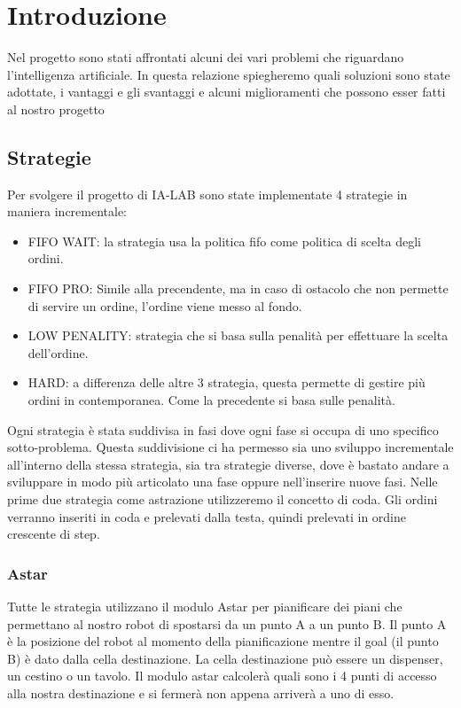 \chapter{Introduzione}
Nel progetto sono stati affrontati alcuni dei vari problemi che riguardano l'intelligenza artificiale. In questa relazione spiegheremo quali soluzioni sono state adottate, i vantaggi e gli svantaggi e alcuni miglioramenti che possono esser fatti al nostro progetto

\section{Strategie}
Per svolgere il progetto di IA-LAB sono state implementate 4 strategie in maniera incrementale:
\begin{itemize}
  \item FIFO WAIT: la strategia usa la politica fifo come politica di scelta degli ordini. 
  \item FIFO PRO: Simile alla precendente, ma in caso di ostacolo che non permette di servire un ordine, l'ordine viene messo al fondo.
  \item LOW PENALITY: strategia che si basa sulla penalità per effettuare la scelta dell'ordine.
  \item HARD: a differenza delle altre 3 strategia, questa permette di gestire più ordini in contemporanea. Come la precedente si basa sulle penalità.
\end{itemize}

Ogni strategia è stata suddivisa in fasi dove ogni fase si occupa di uno specifico sotto-problema. Questa suddivisione ci ha permesso sia uno sviluppo incrementale all'interno della stessa strategia, sia tra strategie diverse, dove è bastato andare a sviluppare in modo più articolato una fase oppure nell'inserire nuove fasi.
Nelle prime due strategia come astrazione utilizzeremo il concetto di coda. Gli ordini verranno inseriti in coda e prelevati dalla testa, quindi prelevati in ordine crescente di step.

\subsection{Astar}
Tutte le strategia utilizzano il modulo Astar per pianificare dei piani che permettano al nostro robot di spostarsi da un punto A a un punto B. Il punto A è la posizione del robot al momento della pianificazione mentre il goal (il punto B) è dato dalla cella destinazione. La cella destinazione può essere un dispenser, un cestino o un tavolo. Il modulo astar calcolerà quali sono i 4 punti di accesso alla nostra destinazione e si fermerà non appena arriverà a uno di esso.

